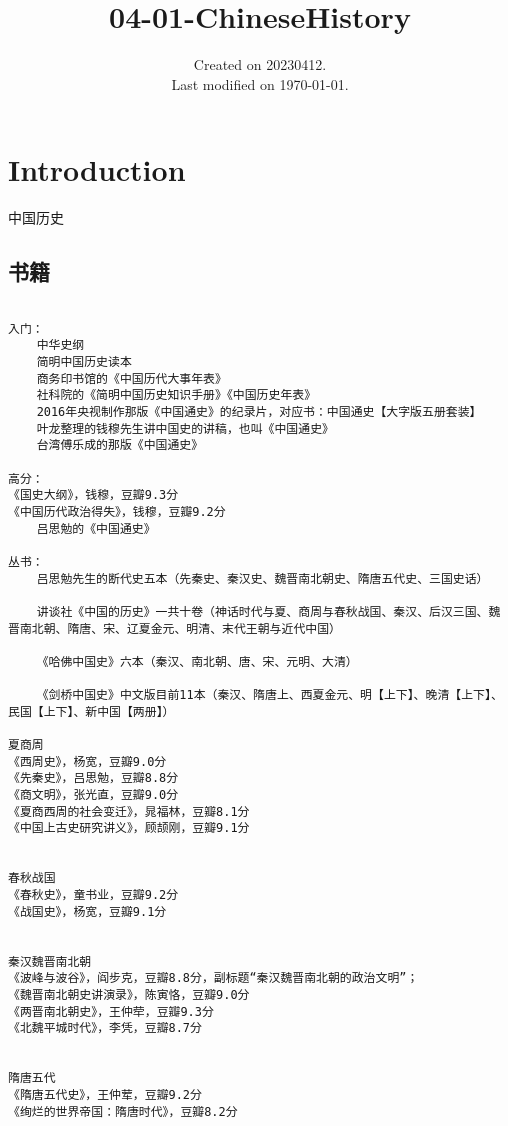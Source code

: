 \documentclass[UTF8]{../../RepresentationUniverse}
\begin{document}
\title{04-01-ChineseHistory}
\date{Created on 20230412.\\   Last modified on \today.}
\maketitle
\tableofcontents


\chapter{Introduction}

中国历史

\section{书籍}

\begin{lstlisting}

入门：
    中华史纲
    简明中国历史读本
    商务印书馆的《中国历代大事年表》
    社科院的《简明中国历史知识手册》《中国历史年表》
    2016年央视制作那版《中国通史》的纪录片，对应书：中国通史【大字版五册套装】
    叶龙整理的钱穆先生讲中国史的讲稿，也叫《中国通史》
    台湾傅乐成的那版《中国通史》

高分：
《国史大纲》，钱穆，豆瓣9.3分
《中国历代政治得失》，钱穆，豆瓣9.2分
    吕思勉的《中国通史》
    
丛书：
    吕思勉先生的断代史五本（先秦史、秦汉史、魏晋南北朝史、隋唐五代史、三国史话）
    
    讲谈社《中国的历史》一共十卷（神话时代与夏、商周与春秋战国、秦汉、后汉三国、魏晋南北朝、隋唐、宋、辽夏金元、明清、末代王朝与近代中国）

    《哈佛中国史》六本（秦汉、南北朝、唐、宋、元明、大清）

    《剑桥中国史》中文版目前11本（秦汉、隋唐上、西夏金元、明【上下】、晚清【上下】、民国【上下】、新中国【两册】）

夏商周
《西周史》，杨宽，豆瓣9.0分
《先秦史》，吕思勉，豆瓣8.8分
《商文明》，张光直，豆瓣9.0分
《夏商西周的社会变迁》，晁福林，豆瓣8.1分
《中国上古史研究讲义》，顾颉刚，豆瓣9.1分


春秋战国
《春秋史》，童书业，豆瓣9.2分
《战国史》，杨宽，豆瓣9.1分


秦汉魏晋南北朝
《波峰与波谷》，阎步克，豆瓣8.8分，副标题“秦汉魏晋南北朝的政治文明”；
《魏晋南北朝史讲演录》，陈寅恪，豆瓣9.0分
《两晋南北朝史》，王仲荦，豆瓣9.3分
《北魏平城时代》，李凭，豆瓣8.7分


隋唐五代
《隋唐五代史》，王仲荤，豆瓣9.2分
《绚烂的世界帝国：隋唐时代》，豆瓣8.2分



\end{lstlisting}
\end{document}
